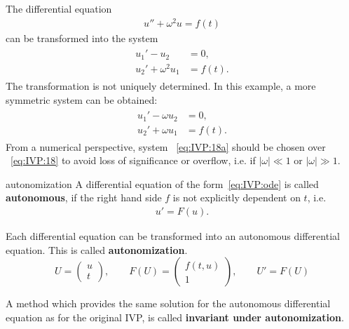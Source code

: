 \begin{example}
  \label{ex:IVP:sine-1}
  The differential equation
  \begin{gather}
    \label{eq:IVP:17}
    u'' + \omega^2 u = f(t)
  \end{gather}
  can be transformed into the system
  \begin{gather}
    \label{eq:IVP:18}
    \begin{split}
      u_1' - u_2 &= 0, \\
      u_2' + \omega^2 u_1 &= f(t).
    \end{split}
  \end{gather}
  The transformation is not uniquely determined. In this example, a
  more symmetric system can be obtained:
  \begin{gather}
    \label{eq:IVP:18a}
    \begin{split}
      u_1' - \omega u_2 &= 0, \\
      u_2' + \omega u_1 &= f(t).
    \end{split}
  \end{gather}
  From a numerical perspective, system ~\ref{eq:IVP:18a} should be
  chosen over ~\ref{eq:IVP:18} to avoid loss of significance or overflow,
  i.e. if $|\omega| \ll 1$ or $|\omega| \gg 1$.
\end{example}

\begin{Definition}{autonomization}
  A differential equation of the form~\eqref{eq:IVP:ode} is called
  \textbf{autonomous},  if
  the right hand side $f$ is not explicitly dependent on $t$, i.e.
  \begin{gather}
    u'=F(u).
  \end{gather}

  Each differential equation can be transformed into an autonomous
  differential equation.  This is called
  \textbf{autonomization}. 
  \begin{equation*}
    U = \begin{pmatrix} u \\ t \end{pmatrix},
    \qquad
    F(U) = \begin{pmatrix} f(t,u) \\ 1 \end{pmatrix},
    \qquad
    U' = F(U)
  \end{equation*}

  A method which provides the same solution for the autonomous
  differential equation as for the original IVP, is called
  \textbf{invariant under autonomization}.
\end{Definition}


